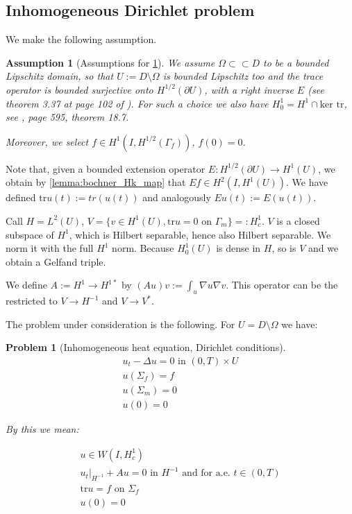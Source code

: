 \documentclass[english,a4paper,12pt,oneside]{scrbook}
\theoremstyle{break}
\newtheorem{ass}[equation]{Assumption}
\newtheorem{pb}[equation]{Problem}
\theoremstyle{remark}
\newcommand{\tr}{\text{tr}}
\newcommand{\cc}{\subset\subset}
\begin{document}
\subsection{Inhomogeneous Dirichlet problem}

We make the following assumption.

\begin{ass}[Assumptions for \cref{pb:diri}]
\label{ass:diri}
We assume $\Omega \cc D $ to be a bounded Lipschitz domain, so that $U:=D\setminus \Omega$ is bounded Lipschitz too and  the trace operator is bounded surjective onto $H^{1/2}(\partial U)$, with a right inverse $E$ (see theorem 3.37 at page 102 of \cite{mclean}). For such a choice we also have $H^1_0=H^1\cap \text{ker }\tr$, see \cite{leoni}, page 595, theorem 18.7.

Moreover, we select $f \in H^1(I, H^{1/2}(\Gamma_f))$, $f(0)=0$.
\end{ass}

Note that, given a bounded extension operator $E: H^{1/2}(\partial U) \rightarrow H^1(U)$, we obtain by \cref{lemma:bochner_Hk_map} that $Ef \in H^2(I, H^1(U))$. We have defined $\tr u (t):= tr(u(t))$ and analogously $Eu(t):=E(u(t))$.

Call $H=L^2(U)$, $V=\{ v \in H^1(U), \tr u = 0 \text{ on } \Gamma_m\}=:H^1_c$. $V$ is a closed subspace of $H^1$, which is Hilbert separable, hence also Hilbert separable. We norm it with the full $H^1$ norm. Because $H^1_0(U)$ is dense in $H$, so is $V$ and we obtain a Gelfand triple. 

We define $A:= H^1 \rightarrow H^{1*}$ by $(Au)v:=\int_u\nabla u \nabla v$. This operator can be the restricted to $V\rightarrow H^{-1}$ and $V\rightarrow V^*$.

The problem under consideration is the following. For $U = D\setminus \Omega$ we have:

\begin{pb}[Inhomogeneous heat equation, Dirichlet conditions]
\label{pb:diri}
\begin{align}
u_t - \Delta u = 0 \text{ in } (0,T)\times U\\
u(\Sigma_f)=f\\
u(\Sigma_m)=0\\
u(0)=0
\end{align}

By this we mean:

\begin{align}
u \in W(I,H^1_c) \\
u_t|_{H^{-1}} + A u = 0 \text{ in }H^{-1} \text{ and for a.e. } t \in (0,T) \\
\tr u = f \text{ on } \Sigma_f\\
u(0)=0
\end{align}

\end{pb}
\end{document}
